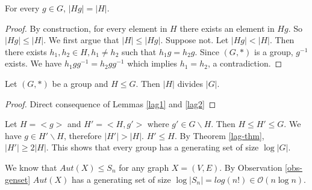 \begin{lemma}
\label{lag2}
For every $g\in G$, $|Hg|=|H|$.
\end{lemma}
\begin{proof}
By construction, for every element in $H$ there exists an element in $Hg$. So $|Hg|\leq |H|$. We first argue that $|H|\leq |Hg|$. Suppose not. Let $|Hg|<|H|$. Then there exists $h_1,h_2 \in H, h_1 \neq h_2$ such that $h_1 g = h_2 g$. Since $(G,*)$ is a group, $g^{-1}$ exists. We have $h_1gg^{-1} = h_2gg^{-1}$ which implies $h_1=h_2$, a contradiction.
\end{proof}

\begin{theorem}
\label{lag-thm}
Let $(G,*)$ be a group and $H\leq G$. Then $|H|$ divides $|G|$.
\end{theorem}
\begin{proof}
Direct consequence of Lemmas \ref{lag1} and \ref{lag2}
\end{proof}

\begin{observation}
\label{obs-genset}
Let $H=<g>$ and $H'=<H,g'>$ where $g'\in G\backslash H$. Then $H\leq H'\leq G$. We have $g\in H'\backslash H$, therefore $|H'|>|H|$. $H'\leq H$. By Theorem \ref{lag-thm}, $|H'|\geq 2|H|$. This shows that every group has a generating set of size $\log|G|$.
\end{observation}

\begin{remark}
We know that $Aut(X)\leq S_n$ for any graph $X=(V,E)$. By Observation \ref{obs-genset} $Aut(X)$ has a generating set of size $\log|S_n| = log(n!) \in \mathcal{O}(n\log n)$.
\end{remark}  


